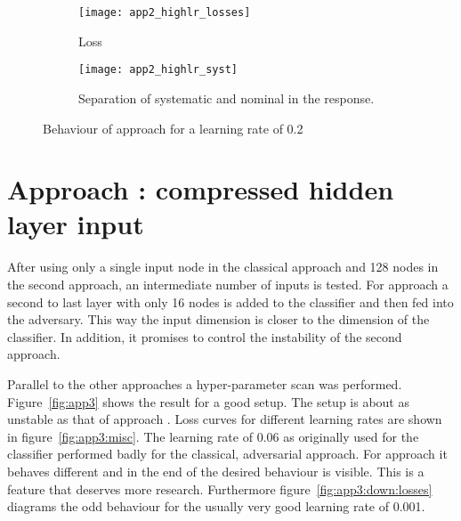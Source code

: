 \begin{figure}[htbp]
    \centering
    \begin{subfigure}[b]{0.45\textwidth}
        \texttt{[image: app2\_highlr\_losses]}
        \caption{Loss}
        \label{fig:app2:highlr:losses}
    \end{subfigure}
\quad
    \begin{subfigure}[b]{0.45\textwidth}
        \texttt{[image: app2\_highlr\_syst]}
        \caption{Separation of systematic and nominal in the response.}
        \label{fig:app2:highlr:syst}
    \end{subfigure}
    \caption{Behaviour of approach  for a learning rate of \num{0.2}}
	\label{fig:app2:highlr}
\end{figure}

\section{Approach : compressed hidden layer input}

After using only a single input node in the classical approach and \num{128} nodes in the second approach, an intermediate number of inputs is tested. For approach  a second to last layer with only \num{16} nodes is added to the classifier and then fed into the adversary. This way the input dimension is closer to the dimension of the classifier. In addition, it promises to control the instability of the second approach.

Parallel to the other approaches a hyper-parameter scan was performed.
Figure~\ref{fig:app3} shows the result for a good setup. The setup is about as unstable as that of approach . Loss curves for different learning rates are shown in figure~\ref{fig:app3:misc}. The learning rate of \num{0.06} as originally used for the classifier performed badly for the classical, adversarial approach. For approach  it behaves different and in the end of the desired behaviour is visible. This is a feature that deserves more research. Furthermore figure~\ref{fig:app3:down:losses} diagrams the odd behaviour for the usually very good learning rate of \num{0.001}. 

